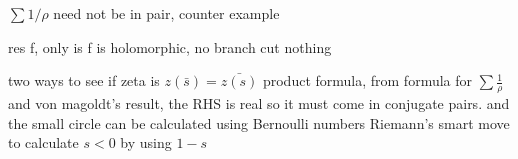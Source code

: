 \documentclass[aps,preprint,preprintnumbers,nofootinbib,showpacs,prd]{revtex4-1}
\begin{document}
$\sum 1/\rho$ need not be in pair, counter example



res f, only is f is holomorphic, no branch cut nothing

two ways to see if zeta is $z(\bar s) = \bar {z(s)}$
product formula, from formula for $\sum \frac{1}{\rho}$ and von magoldt's result, the RHS is real so it must come in conjugate pairs.
and the small circle can be calculated using Bernoulli numbers
Riemann's smart move to calculate $s < 0$ by using $1-s$
\end{document}
